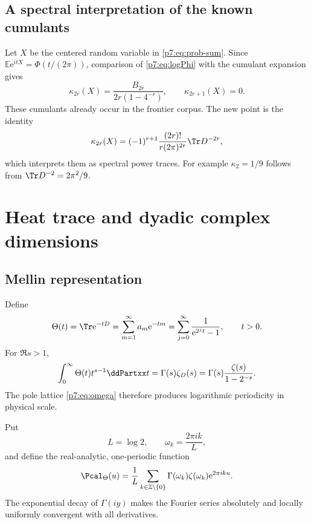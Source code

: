 \documentclass[11pt]{article}
\numberwithin{equation}{section}
\theoremstyle{definition}
\theoremstyle{remark}
\newcommand{\Z}{\mathbb Z}
\newcommand{\e}{\mathrm e}
\begin{document}
\subsection{A spectral interpretation of the known cumulants}

Let $X$ be the centered random variable in \cref{p7:eq:prob-sum}.  Since $\mathbb E\e^{itX}=\Phi(t/(2\pi))$, comparison of \cref{p7:eq:logPhi} with the cumulant expansion gives
\begin{equation}\label{p7:eq:cumulants}
 \kappa_{2r}(X)=\frac{B_{2r}}{2r(1-4^{-r})},
 \qquad
 \kappa_{2r+1}(X)=0.
\end{equation}
These cumulants already occur in the frontier corpus.  The new point is the identity
\begin{equation}\label{p7:eq:cumulant-trace}
 \kappa_{2r}(X)
 =(-1)^{r+1}\frac{(2r)!}{r(2\pi)^{2r}}\Tr D^{-2r},
\end{equation}
which interprets them as spectral power traces.  For example $\kappa_2=1/9$ follows from $\Tr D^{-2}=2\pi^2/9$.

\section{Heat trace and dyadic complex dimensions}

\subsection{Mellin representation}

Define
\begin{equation}\label{p7:eq:Theta}
 \Theta(t)=\Tr\e^{-tD}
 =\sum_{m=1}^{\infty}a_m\e^{-tm}
 =\sum_{j=0}^{\infty}\frac1{\e^{2^jt}-1},
 \qquad t>0.
\end{equation}
For $\Re s>1$,
\begin{equation}\label{p7:eq:Theta-Mellin}
 \int_0^{\infty}\Theta(t)t^{s-1}\ddPartxx t
 =\Gamma(s)\zeta_D(s)
 =\Gamma(s)\frac{\zeta(s)}{1-2^{-s}}.
\end{equation}
The pole lattice \cref{p7:eq:omega} therefore produces logarithmic periodicity in physical scale.

Put
\[
 L=\log2,
 \qquad
 \omega_k=\frac{2\pi i k}{L},
\]
and define the real-analytic, one-periodic function
\begin{equation}\label{p7:eq:Ptheta}
 \Pcal_\Theta(u)=\frac1L\sum_{k\in\Z\setminus\{0\}}
 \Gamma(\omega_k)\zeta(\omega_k)\e^{2\pi iku}.
\end{equation}
The exponential decay of $\Gamma(i y)$ makes the Fourier series absolutely and locally uniformly convergent with all derivatives.
\end{document}
